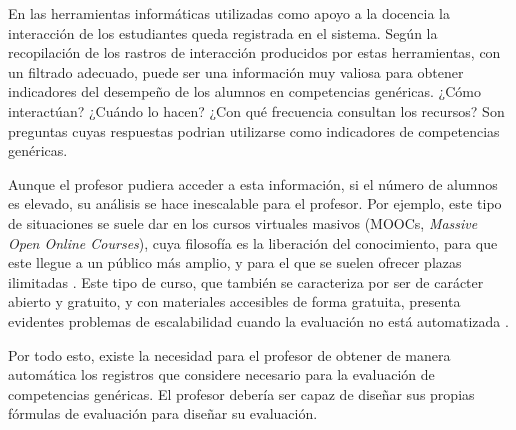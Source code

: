 En las herramientas informáticas utilizadas como apoyo a la docencia la interacción de los estudiantes queda registrada en el sistema. Según \cite{Chebil:2012, Florian:2011} la recopilación de los rastros de interacción producidos por estas herramientas, con un filtrado adecuado, puede ser una información muy valiosa para obtener indicadores del desempeño de los alumnos en competencias genéricas. ¿Cómo interactúan? ¿Cuándo lo hacen? ¿Con qué frecuencia consultan los recursos? Son preguntas cuyas respuestas podrian utilizarse como indicadores de competencias genéricas.

Aunque el profesor pudiera acceder a esta información, si el número de alumnos es elevado, su análisis se hace inescalable para el profesor. Por ejemplo, este tipo de situaciones se suele dar en los cursos virtuales masivos (MOOCs, \emph{Massive Open Online Courses}), cuya filosofía es la liberación del conocimiento, para que este llegue a un público más amplio, y para el que se suelen ofrecer plazas ilimitadas \cite{Lugton:2012, Mor:2013}. Este tipo de curso, que también se caracteriza por ser de carácter abierto y gratuito, y con materiales accesibles de forma gratuita, presenta evidentes problemas de escalabilidad cuando la evaluación no está automatizada \cite{Johnson:2013}.

Por todo esto, existe la necesidad para el profesor de obtener de manera automática los registros que considere necesario para la evaluación de competencias genéricas. El profesor debería ser capaz de diseñar sus propias fórmulas de evaluación para diseñar su evaluación.


